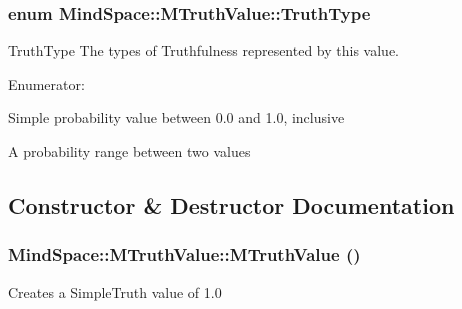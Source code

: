 \subsubsection{\setlength{\rightskip}{0pt plus 5cm}enum \bf{Mind\-Space::MTruth\-Value::Truth\-Type}}\label{classMindSpace_1_1MTruthValue_13bd39f64a968baf8c2eea442a8f8d44}


Truth\-Type The types of Truthfulness represented by this value. 

\begin{Desc}
\item[Enumerator: ]\par
\begin{description}
\item[{\em 
Simple\-Truth\label{classMindSpace_1_1MTruthValue_13bd39f64a968baf8c2eea442a8f8d444d0b9d8e303ed2fe83c6da89f21e1bde}
}]Simple probability value between 0.0 and 1.0, inclusive \item[{\em 
Range\-Truth\label{classMindSpace_1_1MTruthValue_13bd39f64a968baf8c2eea442a8f8d44828d8cd67f84d1de10b24713eb444dc3}
}]A probability range between two values \end{description}
\end{Desc}



\subsection{Constructor \& Destructor Documentation}
\subsubsection{\setlength{\rightskip}{0pt plus 5cm}Mind\-Space::MTruth\-Value::MTruth\-Value ()\hspace{0.3cm}{\tt  [inline]}}\label{classMindSpace_1_1MTruthValue_59f7b61a72bf682dffb143b3ccf0a1cb}


Creates a Simple\-Truth value of 1.0 
